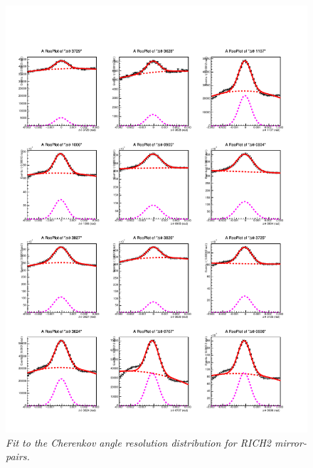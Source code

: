 \begin{figure}[!h]
	\vspace*{-0.cm}
	\begin{center}
		\includegraphics[width=1.\textwidth]{rich2_p6.pdf}
		\vspace*{-1.5cm}
	\end{center}
	\caption{\textit{Fit to the Cherenkov angle resolution distribution for RICH2 mirror-pairs.}}
	\label{fig:rich2p6}
\end{figure}
\clearpage
